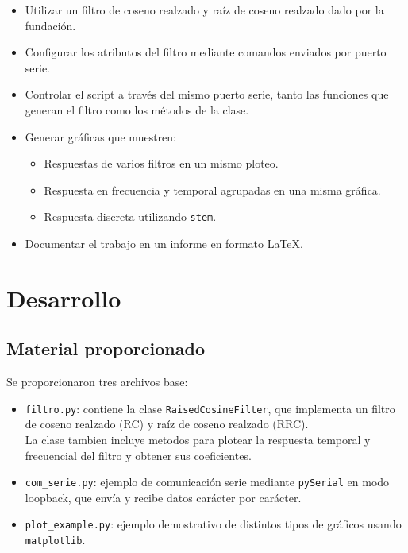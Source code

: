 \documentclass[11pt,a4paper]{article}
\begin{document}
\begin{itemize}
    \item Utilizar un filtro de coseno realzado y raíz de coseno realzado dado por la
          fundación.
    \item Configurar los atributos del filtro mediante comandos enviados por puerto
          serie.
    \item Controlar el script a través del mismo puerto serie, tanto las funciones que
          generan el filtro como los métodos de la clase.
    \item Generar gráficas que muestren:
          \begin{itemize}
              \item Respuestas de varios filtros en un mismo ploteo.
              \item Respuesta en frecuencia y temporal agrupadas en una misma gráfica.
              \item Respuesta discreta utilizando \texttt{stem}.
          \end{itemize}
    \item Documentar el trabajo en un informe en formato \LaTeX.
\end{itemize}

\section{Desarrollo}

\subsection{Material proporcionado}

Se proporcionaron tres archivos base:

\begin{itemize}
    \item \texttt{filtro.py}: contiene la clase \texttt{RaisedCosineFilter}, que implementa un filtro de coseno realzado (RC) y raíz de coseno realzado (RRC). \\
          La clase tambien incluye metodos para plotear la respuesta temporal y frecuencial del filtro y obtener sus coeficientes.
    \item \texttt{com\_serie.py}: ejemplo de comunicación serie mediante \texttt{pySerial} en modo loopback, que envía y recibe datos carácter por carácter.
    \item \texttt{plot\_example.py}: ejemplo demostrativo de distintos tipos de gráficos usando \texttt{matplotlib}.
\end{itemize}
\end{document}
